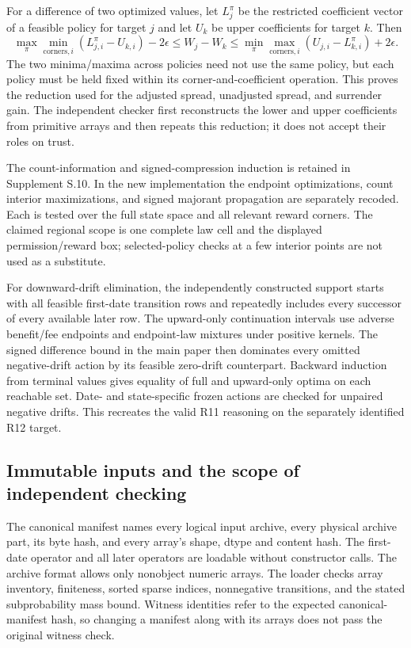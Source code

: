 For a difference of two optimized values, let $L_{j}^{\pi}$ be the restricted coefficient vector of a feasible policy for target $j$ and let $U_k$ be upper coefficients for target $k$. Then
\begin{equation}
 \max_\pi\min_{\text{corners},i}(L_{j,i}^{\pi}-U_{k,i})-2\epsilon
 \leq W_j-W_k
 \leq\min_\pi\max_{\text{corners},i}(U_{j,i}-L_{k,i}^{\pi})+2\epsilon.
\end{equation}
The two minima/maxima across policies need not use the same policy, but each policy must be held fixed within its corner-and-coefficient operation. This proves the reduction used for the adjusted spread, unadjusted spread, and surrender gain. The independent checker first reconstructs the lower and upper coefficients from primitive arrays and then repeats this reduction; it does not accept their roles on trust.

The count-information and signed-compression induction is retained in Supplement S.10. In the new implementation the endpoint optimizations, count interior maximizations, and signed majorant propagation are separately recoded. Each is tested over the full state space and all relevant reward corners. The claimed regional scope is one complete law cell and the displayed permission/reward box; selected-policy checks at a few interior points are not used as a substitute.

For downward-drift elimination, the independently constructed support starts with all feasible first-date transition rows and repeatedly includes every successor of every available later row. The upward-only continuation intervals use adverse benefit/fee endpoints and endpoint-law mixtures under positive kernels. The signed difference bound in the main paper then dominates every omitted negative-drift action by its feasible zero-drift counterpart. Backward induction from terminal values gives equality of full and upward-only optima on each reachable set. Date- and state-specific frozen actions are checked for unpaired negative drifts. This recreates the valid R11 reasoning on the separately identified R12 target.

\subsection{Immutable inputs and the scope of independent checking}
The canonical manifest names every logical input archive, every physical archive part, its byte hash, and every array's shape, dtype and content hash. The first-date operator and all later operators are loadable without constructor calls. The archive format allows only nonobject numeric arrays. The loader checks array inventory, finiteness, sorted sparse indices, nonnegative transitions, and the stated subprobability mass bound. Witness identities refer to the expected canonical-manifest hash, so changing a manifest along with its arrays does not pass the original witness check.

